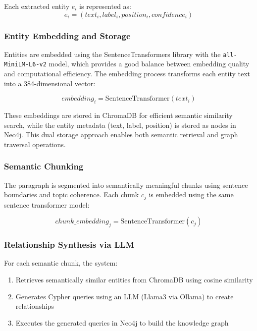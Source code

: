 \documentclass[conference]{IEEEtran}
\begin{document}
Each extracted entity $e_i$ is represented as:
\begin{equation}
e_i = (text_i, label_i, position_i, confidence_i)
\end{equation}

\subsubsection{Entity Embedding and Storage}
Entities are embedded using the SentenceTransformers library with the \texttt{all-MiniLM-L6-v2} model, which provides a good balance between embedding quality and computational efficiency. The embedding process transforms each entity text into a 384-dimensional vector:

\begin{equation}
embedding_i = \text{SentenceTransformer}(text_i)
\end{equation}

These embeddings are stored in ChromaDB for efficient semantic similarity search, while the entity metadata (text, label, position) is stored as nodes in Neo4j. This dual storage approach enables both semantic retrieval and graph traversal operations.

\subsubsection{Semantic Chunking}
The paragraph is segmented into semantically meaningful chunks using sentence boundaries and topic coherence. Each chunk $c_j$ is embedded using the same sentence transformer model:

\begin{equation}
chunk\_embedding_j = \text{SentenceTransformer}(c_j)
\end{equation}

\subsubsection{Relationship Synthesis via LLM}
For each semantic chunk, the system:
\begin{enumerate}
\item Retrieves semantically similar entities from ChromaDB using cosine similarity
\item Generates Cypher queries using an LLM (Llama3 via Ollama) to create relationships
\item Executes the generated queries in Neo4j to build the knowledge graph
\end{enumerate}
\end{document}

